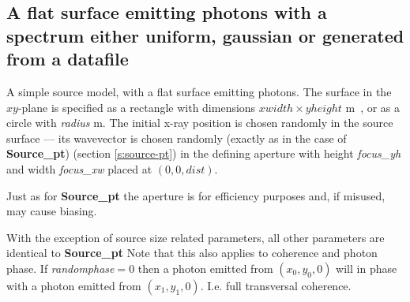 \subsection*{A flat surface emitting photons with a spectrum either uniform, gaussian or generated from a datafile}
\label{source-flat}
A simple source model, with a flat surface emitting photons. The surface in the
$xy$-plane is specified as a rectangle with dimensions
$\mathit{xwidth}\times \mathit{yheight}$ \si{m \squared}, or as a circle with \textit{radius} \si{m}. 
The initial x-ray position is chosen randomly in the source surface --- its
wavevector is chosen randomly (exactly as in the case of \textbf{Source\_pt})
(section \ref{s:source-pt}) in the defining aperture with height \textit{focus\_yh} and
width \textit{focus\_xw} placed at $(0,0,\mathit{dist})$. 

Just as for \textbf{Source\_pt} the aperture is for efficiency purposes and, if misused, may cause biasing.

With the exception of source size related parameters, all other parameters are
identical to \textbf{Source\_pt} Note that this also applies to coherence and
photon phase. If \textit{randomphase}$=0$ then a photon emitted from
$(x_0,y_0,0)$ will in phase with a photon emitted from $(x_1,y_1,0)$. I.e. full
transversal coherence.
